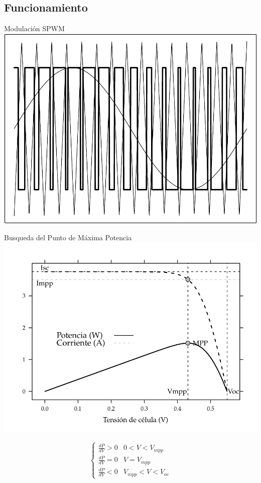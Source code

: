 \documentclass[xcolor={usenames,svgnames,dvipsnames}]{beamer}
\begin{document}
\subsection{Funcionamiento}
\label{sec-2-5}
\begin{frame}[label=sec-2-5-1]{Modulación SPWM}
\includegraphics[width=.9\linewidth]{../figs/SPWMMonofasico.pdf}
\end{frame}

\begin{frame}[label=sec-2-5-2]{Busqueda del Punto de Máxima Potencia}
\includegraphics[width=.9\linewidth]{../figs/CurvaIV_Ta20_G800.pdf}

$$\begin{cases}
      \frac{dP}{dV}>0 & 0<V<V_{mpp}\\
      \frac{dP}{dV}=0 & V=V_{mpp}\\
      \frac{dP}{dV}<0 & V_{mpp}<V<V_{oc}\end{cases}$$
\end{frame}
\end{document}
